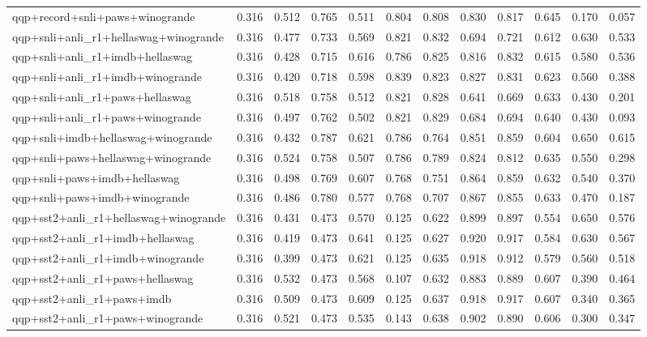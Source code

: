 \begin{table}[t]
\begin{tabular}{lrrrrrrrrrrr}
    qqp+record+snli+paws+winogrande & 0.316 & 0.512 & 0.765 & 0.511 & 0.804 & 0.808 & 0.830 & 0.817 & 0.645 & 0.170 & 0.057 \\
    qqp+snli+anli\_r1+hellaswag+winogrande & 0.316 & 0.477 & 0.733 & 0.569 & 0.821 & 0.832 & 0.694 & 0.721 & 0.612 & 0.630 & 0.533 \\
    qqp+snli+anli\_r1+imdb+hellaswag & 0.316 & 0.428 & 0.715 & 0.616 & 0.786 & 0.825 & 0.816 & 0.832 & 0.615 & 0.580 & 0.536 \\
    qqp+snli+anli\_r1+imdb+winogrande & 0.316 & 0.420 & 0.718 & 0.598 & 0.839 & 0.823 & 0.827 & 0.831 & 0.623 & 0.560 & 0.388 \\
    qqp+snli+anli\_r1+paws+hellaswag & 0.316 & 0.518 & 0.758 & 0.512 & 0.821 & 0.828 & 0.641 & 0.669 & 0.633 & 0.430 & 0.201 \\
    qqp+snli+anli\_r1+paws+winogrande & 0.316 & 0.497 & 0.762 & 0.502 & 0.821 & 0.829 & 0.684 & 0.694 & 0.640 & 0.430 & 0.093 \\
    qqp+snli+imdb+hellaswag+winogrande & 0.316 & 0.432 & 0.787 & 0.621 & 0.786 & 0.764 & 0.851 & 0.859 & 0.604 & 0.650 & 0.615 \\
    qqp+snli+paws+hellaswag+winogrande & 0.316 & 0.524 & 0.758 & 0.507 & 0.786 & 0.789 & 0.824 & 0.812 & 0.635 & 0.550 & 0.298 \\
    qqp+snli+paws+imdb+hellaswag & 0.316 & 0.498 & 0.769 & 0.607 & 0.768 & 0.751 & 0.864 & 0.859 & 0.632 & 0.540 & 0.370 \\
    qqp+snli+paws+imdb+winogrande & 0.316 & 0.486 & 0.780 & 0.577 & 0.768 & 0.707 & 0.867 & 0.855 & 0.633 & 0.470 & 0.187 \\
    qqp+sst2+anli\_r1+hellaswag+winogrande & 0.316 & 0.431 & 0.473 & 0.570 & 0.125 & 0.622 & 0.899 & 0.897 & 0.554 & 0.650 & 0.576 \\
    qqp+sst2+anli\_r1+imdb+hellaswag & 0.316 & 0.419 & 0.473 & 0.641 & 0.125 & 0.627 & 0.920 & 0.917 & 0.584 & 0.630 & 0.567 \\
    qqp+sst2+anli\_r1+imdb+winogrande & 0.316 & 0.399 & 0.473 & 0.621 & 0.125 & 0.635 & 0.918 & 0.912 & 0.579 & 0.560 & 0.518 \\
    qqp+sst2+anli\_r1+paws+hellaswag & 0.316 & 0.532 & 0.473 & 0.568 & 0.107 & 0.632 & 0.883 & 0.889 & 0.607 & 0.390 & 0.464 \\
    qqp+sst2+anli\_r1+paws+imdb & 0.316 & 0.509 & 0.473 & 0.609 & 0.125 & 0.637 & 0.918 & 0.917 & 0.607 & 0.340 & 0.365 \\
    qqp+sst2+anli\_r1+paws+winogrande & 0.316 & 0.521 & 0.473 & 0.535 & 0.143 & 0.638 & 0.902 & 0.890 & 0.606 & 0.300 & 0.347 \\

\end{tabular}
\end{table}
